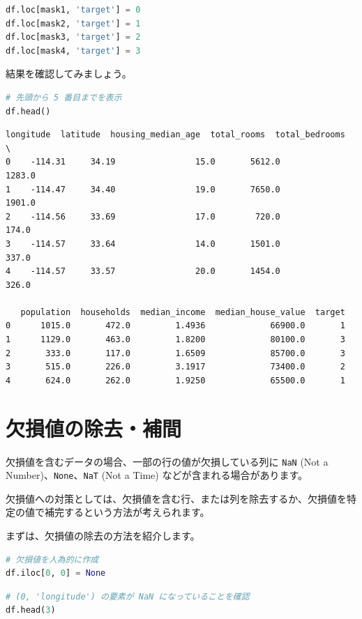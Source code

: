 \begin{lstlisting}[style=codecell,language=Python]
df.loc[mask1, 'target'] = 0
df.loc[mask2, 'target'] = 1
df.loc[mask3, 'target'] = 2
df.loc[mask4, 'target'] = 3
\end{lstlisting}

結果を確認してみましょう。


\begin{lstlisting}[style=codecell,language=Python]
# 先頭から 5 番目までを表示
df.head()
\end{lstlisting}

\begin{lstlisting}[style=outputcell]
   longitude  latitude  housing_median_age  total_rooms  total_bedrooms  \
0    -114.31     34.19                15.0       5612.0          1283.0   
1    -114.47     34.40                19.0       7650.0          1901.0   
2    -114.56     33.69                17.0        720.0           174.0   
3    -114.57     33.64                14.0       1501.0           337.0   
4    -114.57     33.57                20.0       1454.0           326.0   

   population  households  median_income  median_house_value  target  
0      1015.0       472.0         1.4936             66900.0       1  
1      1129.0       463.0         1.8200             80100.0       3  
2       333.0       117.0         1.6509             85700.0       3  
3       515.0       226.0         3.1917             73400.0       2  
4       624.0       262.0         1.9250             65500.0       1  
\end{lstlisting}

\section{欠損値の除去・補間}


欠損値を含むデータの場合、一部の行の値が欠損している列に \texttt{NaN} (Not a Number)、\texttt{None}、\texttt{NaT} (Not a Time) などが含まれる場合があります。

欠損値への対策としては、欠損値を含む行、または列を除去するか、欠損値を特定の値で補完するという方法が考えられます。


まずは、欠損値の除去の方法を紹介します。


\begin{lstlisting}[style=codecell,language=Python]
# 欠損値を人為的に作成
df.iloc[0, 0] = None
\end{lstlisting}

\begin{lstlisting}[style=codecell,language=Python]
# (0, 'longitude') の要素が NaN になっていることを確認
df.head(3)
\end{lstlisting}


